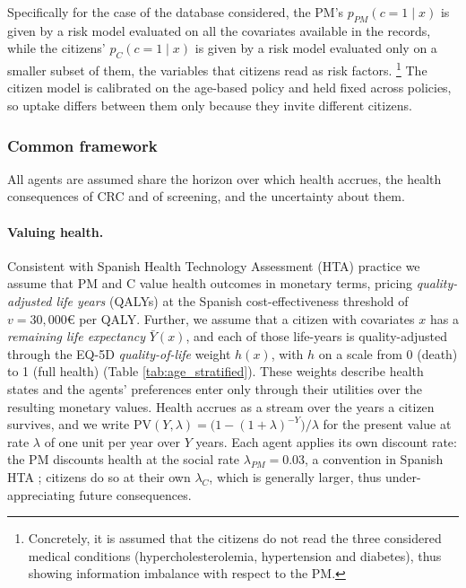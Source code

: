\documentclass[12pt]{article}
\begin{document}
Specifically for the case of the database considered, the PM's $p_{PM}(c=1 \mid x)$ is given by a risk model evaluated on all the covariates available in the records, while the citizens' $p_{C}(c=1 \mid x)$ is given by a risk model evaluated only on a smaller subset of them, the variables that citizens read as risk factors. \footnote{Concretely, it is assumed that the citizens do not read the three considered medical conditions (hypercholesterolemia, hypertension and diabetes), thus showing information imbalance with respect to the PM.} The citizen model is calibrated on the age-based policy and held fixed across policies, so uptake differs between them only because they invite different citizens. 

\subsubsection{Common framework}\label{sec:common_framework}
All agents are assumed share the horizon over which health accrues, the health consequences of CRC and of screening, and the uncertainty about them. 
\paragraph{Valuing health.}  Consistent with Spanish Health Technology Assessment (HTA) practice \citep{vallejo2018estimating, sacristan2002que} we assume that PM and C value health outcomes in monetary terms, pricing \emph{quality-adjusted life years} (QALYs) at the Spanish cost-effectiveness threshold of $v = 30{,}000$€ per QALY. Further, we assume that a citizen with covariates $x$ has a \emph{remaining life expectancy} $\bar{Y}(x)$, and each of those life-years is quality-adjusted through the EQ-5D \emph{quality-of-life} weight $h(x)$, with $h$ on a scale from 0 (death) to 1 (full health) \citep{garcia2016normative} (Table \ref{tab:age_stratified}). These weights describe health states and the agents' preferences enter only through their utilities over the resulting monetary values. Health accrues as a stream over the years a citizen survives, and we write $\mathrm{PV}(Y,\lambda) = \big(1-(1+\lambda)^{-Y}\big)/\lambda$ for the present value at rate $\lambda$ of one unit per year over $Y$ years. Each agent applies its own discount rate: the PM discounts health at the social rate $\lambda_{PM} = 0.03$, a convention in Spanish HTA \citep{lopez2010spanish}; citizens do so at their own $\lambda_C$, which is generally larger, thus under-appreciating future consequences.
\end{document}
